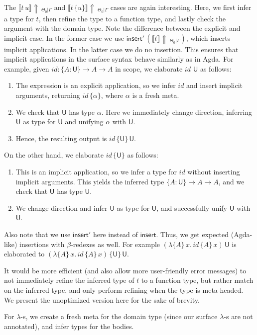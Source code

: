 \documentclass[acmsmall,review,anonymous,prologue,dvipsnames]{acmart}\settopmatter{printfolios=true,printccs=false,printacmref=false}
\renewcommand{\U}{\mathsf{U}}
\newcommand{\mi}[1]{\mathit{#1}}
\newcommand{\einfer}[3]{\llbracket#1\rrbracket\!\Uparrow\,_{#2|#3}}
\newcommand{\einsert}{\mathsf{insert}}
\theoremstyle{remark}
\begin{document}
The $\einfer{t\,u}{\Theta_0}{\Gamma}$ and $\einfer{t\,\{u\}}{\Theta_0}{\Gamma}$
cases are again interesting. Here, we first infer a type for $t$, then refine
the type to a function type, and lastly check the argument with the domain
type. Note the difference between the explicit and implicit case. In the former
case we use $\einsert'\,(\einfer{t}{\Theta_0}{\Gamma})$, which inserts implicit
applications. In the latter case we do no insertion. This ensures that implicit
applications in the surface syntax behave similarly as in Agda. For example,
given $\mi{id} : \{A : \U\}\to A\to A$ in scope, we elaborate $\mi{id}\,\,\U$ as follows:
\begin{enumerate}
  \item The expression is an explicit application, so we infer $\mi{id}$ and insert implicit
        arguments, returning $\mi{id}\,\{\alpha\}$, where $\alpha$ is a fresh meta.
  \item We check that $\U$ has type $\alpha$. Here we immediately change direction,
        inferring $\U$ as type for $\U$ and unifying $\alpha$ with $\U$.
  \item Hence, the resulting output is $\mi{id}\,\{\U\}\,\U$.
\end{enumerate}
On the other hand, we elaborate $\mi{id}\,\{\U\}$ as follows:
\begin{enumerate}
  \item This is an implicit application, so we infer a type for $\mi{id}$ without inserting
    implicit arguments. This yields the inferred type $\{A : \U\}\to A\to A$, and
    we check that $\U$ has type $\U$.
  \item We change direction and infer $\U$ as type for $\U$, and successfully
    unify $\U$ with $\U$.
\end{enumerate}
Also note that we use $\einsert'$ here instead of $\einsert$. Thus, we get
expected (Agda-like) insertions with $\beta$-redexes as well. For example
$(\lambda\{A\}\,x.\, \mi{id}\,\{A\}\,x)\,\U$ is elaborated to
$(\lambda\{A\}\,x.\, \mi{id}\,\{A\}\,x)\,\{\U\}\,\U$.

It would be more efficient (and also allow more user-friendly error
messages) to not immediately refine the inferred type of $t$ to a function type,
but rather match on the inferred type, and only perform refining when the type
is meta-headed. We present the unoptimized version here for the sake of brevity.

For $\lambda$-s, we create a fresh meta for the domain type (since our surface
$\lambda$-s are not annotated), and infer types for the bodies.
\end{document}
